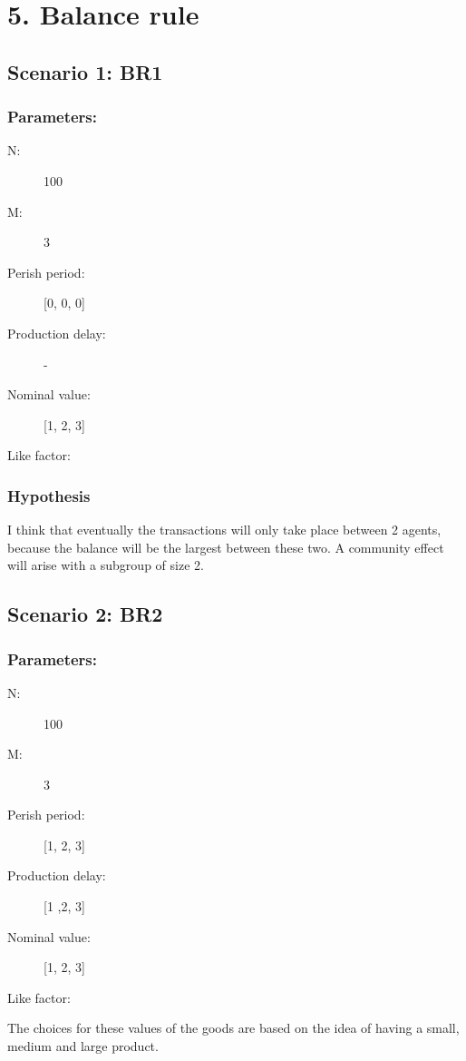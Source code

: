 \documentclass{article}
\begin{document}
\section{5. Balance rule}

\subsection{Scenario 1: BR1}
\subsubsection{Parameters:}
\begin{description}
  \item[N:] 100
  \item[M:] 3
  \item[Perish period:] [0, 0, 0]
  \item[Production delay:] -
  \item[Nominal value:] [1, 2, 3]
  \item[Like factor:] 
\end{description}

\subsubsection{Hypothesis}
I think that eventually the transactions will only take place between 2 agents, because the balance will be the largest between these two. A community effect will arise with a subgroup of size 2.

\subsection{Scenario 2: BR2}
\subsubsection{Parameters:}
\begin{description}
  \item[N:] 100
  \item[M:] 3
  \item[Perish period:] [1, 2, 3]
  \item[Production delay:] [1 ,2, 3]
  \item[Nominal value:] [1, 2, 3]
  \item[Like factor:] 
\end{description}

The choices for these values of the goods are based on the idea of having a small, medium and large product.
\end{document}
